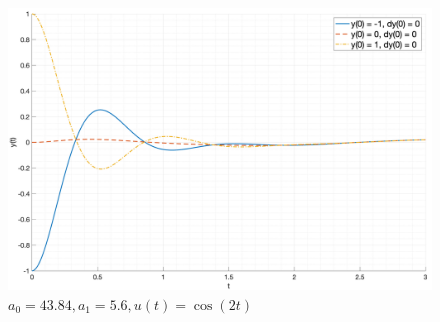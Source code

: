 \begin{figure}[ht!]
    \centering
    \includegraphics[width=\textwidth]{media/plots/case1_input3.png}
    \caption{$a_0 = 43.84, a_1 = 5.6, u(t) = \cos(2t)$}
    \label{fig:case1_input3}
\end{figure}

